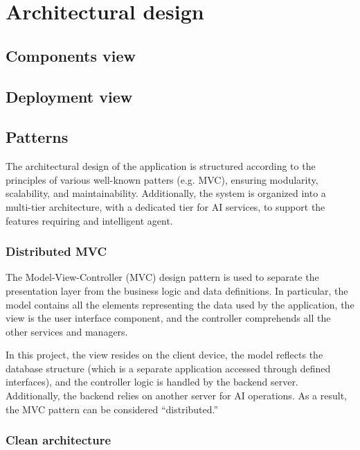 \documentclass{article}
\begin{document}
\section{Architectural design}

\subsection{Components view}


\subsection{Deployment view}


\subsection{Patterns}

The architectural design of the application is structured according to the principles of various well-known patters (e.g. MVC), ensuring modularity, scalability, and maintainability.
Additionally, the system is organized into a multi-tier architecture, with a dedicated tier for AI services, to support the features requiring and intelligent agent.

\subsubsection{Distributed MVC}

The Model-View-Controller (MVC) design pattern is used to separate the presentation layer from the business logic and data definitions.
In particular, the model contains all the elements representing the data used by the application, the view is the user interface component, and the controller comprehends all the other services and managers.

In this project, the view resides on the client device, the model reflects the database structure (which is a separate application accessed through defined interfaces), and the controller logic is handled by the backend server.
Additionally, the backend relies on another server for AI operations.
As a result, the MVC pattern can be considered “distributed.”

\subsubsection{Clean architecture}
\end{document}
